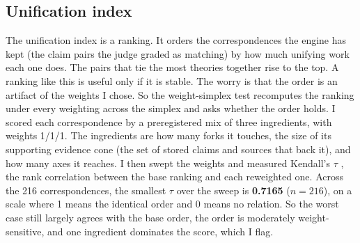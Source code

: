 \documentclass[11pt]{article}
\begin{document}
\subsection{Unification index}
The unification index is a ranking. It orders the correspondences the engine has kept (the claim pairs the
judge graded as matching) by how much unifying work each one does. The pairs that tie the most theories
together rise to the top. A ranking like this is useful only if it is stable. The worry is that the order
is an artifact of the weights I chose. So the weight-simplex test recomputes the ranking under every
weighting across the simplex and asks whether the order holds. I scored each correspondence by a
preregistered mix of three ingredients, with weights 1/1/1. The ingredients are how many forks it touches,
the size of its supporting evidence cone (the set of stored claims and sources that back it), and how many
axes it reaches. I then swept the weights and measured Kendall's
$\tau$ \cite{kendall1938}, the rank correlation between the base ranking and each reweighted one. Across the
216 correspondences, the smallest $\tau$ over the sweep is \textbf{0.7165} ($n = 216$), on a scale where 1
means the identical order and 0 means no relation. So the worst case still largely agrees with the base
order, the order is moderately weight-sensitive, and one ingredient
dominates the score, which I flag.
\end{document}
